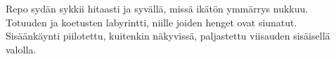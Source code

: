 \documentclass{article}
\begin{document}
\begin{infobox}
Repo sydän sykkii hitaasti ja syvällä, missä ikätön ymmärrys nukkuu.\\
Totuuden ja koetusten labyrintti, niille joiden henget ovat siunatut.\\
Sisäänkäynti piilotettu, kuitenkin näkyvissä, paljastettu viisauden sisäisellä valolla.
\end{infobox}
\end{document}
